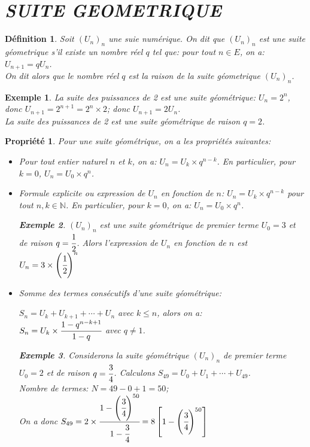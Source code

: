 \documentclass[a4paper, 12pt]{report}
\newtheorem{definition}{Définition}[section]
\newtheorem{propriete}{Propriété}[section]
\newtheorem{exemple}{Exemple}[section]
\begin{document}
    \section{\textit{SUITE GEOMETRIQUE}}
        \begin{definition}
            Soit $(U_n)_n$ une suie numérique. On dit que $(U_n)_n$ est une suite géometrique s'il existe un nombre réel $q$ tel que:
            pour tout $n\in E$, on a: \textbf{$U_{n+1}=qU_n$}.\\ 
            On dit alors que le nombre réel $q$ est la raison de la suite géometrique $(U_n)_n$.
        \end{definition}
        \begin{exemple}
            La suite des puissances de 2 est une suite géométrique: $U_n=2^n$, donc $U_{n+1}=2^{n+1}=2^n\times 2$; donc $U_{n+1}=2U_n$.\\ 
            La suite des puissances de 2 est une suite géométrique de raison $q=2$.
        \end{exemple}
        \begin{propriete}
            Pour une suite géométrique, on a les propriétés suivantes:
            \begin{itemize}
                \item Pour tout entier naturel $n$ et $k$, on a: $U_n=U_k\times q^{n-k}$. En particulier, pour $k=0$, $U_n=U_0\times q^n$.
                \item Formule explicite ou expression de $U_n$ en fonction de $n$:
                $U_n=U_k \times q^{n-k}$ pour tout $n,k\in\mathbb{N}$. En particulier, pour $k=0$, on a: $U_n=U_0\times q^n$.
                \begin{exemple}
                    $(U_n)_n$ est une suite géométrique de premier terme $U_0=3$ et de raison $q=\cfrac{1}{2}$. Alors l'expression de $U_n$ en 
                     fonction de $n$ est $U_n=3\times \left(\cfrac{1}{2}\right)^n$
                \end{exemple}
                \item Somme des termes consécutifs d'une suite géométrique:
                    \begin{center}
                        $S_n=U_k+U_{k+1}+\cdots+U_n$ avec $k\leq n$, alors on a: \\
                        $S_n=U_k \times \cfrac{1-q^{n-k+1}}{1-q}$ avec $q \neq 1$.
                    \end{center}
                \begin{exemple}
                    Considerons la suite géométrique $(U_n)_n$ de premier terme $U_0=2$ et de raison $q=\cfrac{3}{4}$. 
                    Calculons $S_{49}=U_0+U_1+\cdots+U_{49}$.\\ 
                    Nombre de termes: $N=49-0+1=50$; \\ 
                    On a donc $S_{49}=2\times \cfrac{1-\left(\cfrac{3}{4}\right)^{50}}{1-\cfrac{3}{4}}=8\left[1-\left(\cfrac{3}{4}\right)^{50}\right]$
                \end{exemple}
            \end{itemize}
        \end{propriete}
\end{document}
